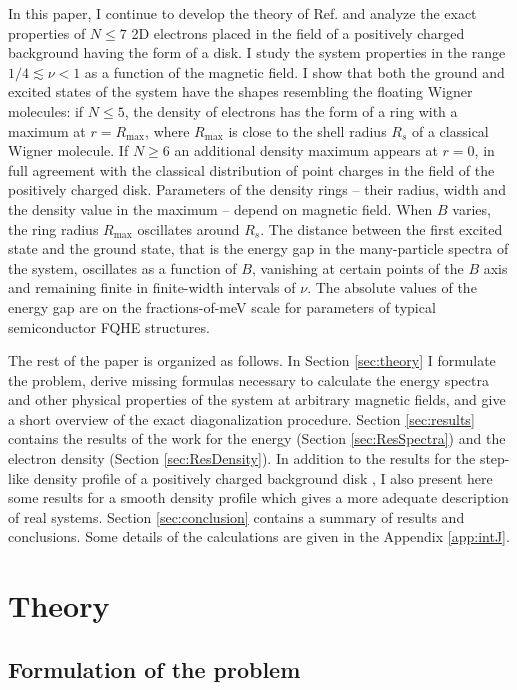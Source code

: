 \documentclass[aps,prb,10pt%
]{revtex4-2}
\begin{document}
In this paper, I continue to develop the theory of Ref. \cite{Mikhailov23a} and analyze the exact properties of $N\le 7$ 2D electrons placed in the field of a positively charged background having the form of a disk. I study the system properties in the range $1/4\lesssim\nu<1$ as a function of the magnetic field. I show that both the ground and excited states of the system have the shapes resembling the floating Wigner molecules: if $N\le 5$, the density of electrons has the form of a ring with a maximum at $r=R_{\max}$, where $R_{\max}$ is close to the shell radius $R_s$ of a classical Wigner molecule. If $N\ge 6$ an additional density maximum appears at $r=0$, in full agreement with the classical distribution of point charges in the field of the positively charged disk. Parameters of the density rings -- their radius, width and the density value in the maximum -- depend on magnetic field. When $B$ varies, the ring radius $R_{\max}$ oscillates around $R_s$. The distance between the first excited state and the ground state, that is the energy gap in the  many-particle spectra of the system, oscillates as a function of $B$, vanishing at certain points of the $B$ axis and remaining finite in finite-width intervals of $\nu$. The absolute values of the energy gap are on the fractions-of-meV scale for parameters of typical semiconductor FQHE structures.

The rest of the paper is organized as follows. In Section \ref{sec:theory} I formulate the problem, derive missing formulas necessary to calculate the energy spectra and other physical properties of the system at arbitrary magnetic fields, and give a short overview of the exact diagonalization procedure. Section \ref{sec:results} contains the results of the work for the energy (Section \ref{sec:ResSpectra}) and the electron density (Section \ref{sec:ResDensity}). In addition to the results for the step-like density profile of a positively charged background disk \cite{Mikhailov23a}, I also present here some results for a smooth density profile which gives a more adequate description of real systems. Section \ref{sec:conclusion} contains a summary of results and conclusions. Some details of the calculations are given in the Appendix \ref{app:intJ}.

\section{Theory\label{sec:theory}}

\subsection{Formulation of the problem\label{sec:formulation}}
\end{document}
